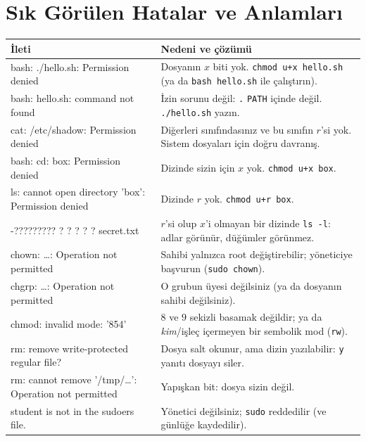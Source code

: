 \documentclass[11pt,a4paper]{article}
\newcommand{\cmd}[1]{\texttt{#1}}
\begin{document}
\section{Sık Görülen Hatalar ve Anlamları}

\begin{center}
\small
\begin{tabularx}{\linewidth}{@{}>{\ttfamily\raggedright\arraybackslash}p{5.3cm} X@{}}
\toprule
\textbf{\normalfont İleti} & \textbf{Nedeni ve çözümü} \\
\midrule
bash: ./hello.sh: Permission denied & Dosyanın $x$ biti yok. \cmd{chmod u+x hello.sh} (ya da \cmd{bash hello.sh} ile çalıştırın). \\
bash: hello.sh: command not found & İzin sorunu değil: \texttt{.} \texttt{PATH} içinde değil. \cmd{./hello.sh} yazın. \\
cat: /etc/shadow: Permission denied & Diğerleri sınıfındasınız ve bu sınıfın $r$'si yok. Sistem dosyaları için doğru davranış. \\
bash: cd: box: Permission denied & Dizinde sizin için $x$ yok. \cmd{chmod u+x box}. \\
ls: cannot open directory 'box': Permission denied & Dizinde $r$ yok. \cmd{chmod u+r box}. \\
-????????? ? ? ? ? ? secret.txt & $r$'si olup $x$'i olmayan bir dizinde \cmd{ls -l}: adlar görünür, düğümler görünmez. \\
chown: \dots: Operation not permitted & Sahibi yalnızca root değiştirebilir; yöneticiye başvurun (\cmd{sudo chown}). \\
chgrp: \dots: Operation not permitted & O grubun üyesi değilsiniz (ya da dosyanın sahibi değilsiniz). \\
chmod: invalid mode: '854' & $8$ ve $9$ sekizli basamak değildir; ya da \emph{kim}/işleç içermeyen bir sembolik mod (\texttt{rw}). \\
rm: remove write-protected regular file? & Dosya salt okunur, ama dizin yazılabilir: \texttt{y} yanıtı dosyayı siler. \\
rm: cannot remove '/tmp/\dots': Operation not permitted & Yapışkan bit: dosya sizin değil. \\
student is not in the sudoers file. & Yönetici değilsiniz; \cmd{sudo} reddedilir (ve günlüğe kaydedilir). \\
\bottomrule
\end{tabularx}
\end{center}
\end{document}
